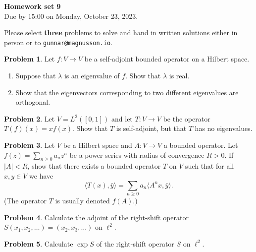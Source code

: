 \documentclass[11pt]{article}
\theoremstyle{definition}
\newtheorem{prob}{Problem}
\def\<{\langle}
\def\>{\rangle}
\def\head{
	\begin{center}
		\textbf{\LARGE Homework set 9}
		\\[3pt]
		Due by 15:00 on Monday, October 23, 2023.
	\end{center}
	\medskip
}
\begin{document}
\head

Please select \textbf{three} problems to solve and hand in written solutions
either in person or to \verb+gunnar@magnusson.io+.

\begin{prob}
	Let $f : V \to V$ be a self-adjoint bounded operator on a Hilbert space.
	\begin{enumerate}
		\item
			Suppose that $\lambda$ is an eigenvalue of $f$. Show that $\lambda$ is real.

		\item
			Show that the eigenvectors corresponding to two different eigenvalues are orthogonal.
	\end{enumerate}
\end{prob}

\begin{prob}
	Let $V = L^2([0,1])$ and let $T : V \to V$ be the operator $T(f)(x) = x f(x)$.
	Show that $T$ is self-adjoint, but that $T$ has no eigenvalues.
\end{prob}

\begin{prob}
	Let $V$ be a Hilbert space and $A : V \to V$ a bounded operator.
	Let $f(z) = \sum_{n \geq 0} a_n z^n$ be a power series with radius of convergence $R > 0$.
	If $|A| < R$, show that there exists a bounded operator $T$ on $V$ such that for all $x,y \in V$ we have
	\[
		\< T(x), \bar y \> = \sum_{n \geq 0} a_n \< A^n x, \bar y \>.
	\]
	(The operator $T$ is usually denoted $f(A)$.)
\end{prob}

\begin{prob}
	Calculate the adjoint of the right-shift operator $S(x_1, x_2, \ldots) = (x_2, x_3, \ldots)$ on $\ell^2$.
\end{prob}

\begin{prob}
	Calculate $\exp S$ of the right-shift operator $S$ on $\ell^2$.
\end{prob}
\end{document}
